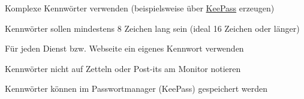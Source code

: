 \item Komplexe Kennwörter verwenden (beispielsweise über \href{https://keepass.info/}{KeePass} erzeugen)
\item Kennwörter sollen mindestens 8 Zeichen lang sein (ideal 16 Zeichen oder länger)
\item Für jeden Dienst bzw. Webseite ein eigenes Kennwort verwenden
\item Kennwörter nicht auf Zetteln oder Post-its am Monitor notieren
\item Kennwörter können im Passwortmanager (KeePass) gespeichert werden